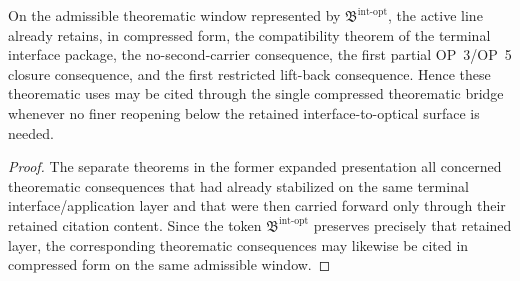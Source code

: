 \begin{theorem}
\label{thm:first-bundled-interface-compatibility-theorem}
\label{thm:first-no-second-carrier-theorem-on-the-terminal-interface}
\label{thm:first-partial-op3-op5-closure-theorem-on-the-terminal-interface}
\label{thm:first-restricted-lift-back-theorem-from-the-terminal-interface}
On the admissible theorematic window represented by $\mathfrak B^{\mathrm{int\text{-}opt}}$, the active line already retains, in compressed form, the compatibility theorem of the terminal interface package, the no-second-carrier consequence, the first partial OP~3/OP~5 closure consequence, and the first restricted lift-back consequence. Hence these theorematic uses may be cited through the single compressed theorematic bridge whenever no finer reopening below the retained interface-to-optical surface is needed.
\end{theorem}

\begin{proof}
The separate theorems in the former expanded presentation all concerned theorematic consequences that had already stabilized on the same terminal interface/application layer and that were then carried forward only through their retained citation content. Since the token $\mathfrak B^{\mathrm{int\text{-}opt}}$ preserves precisely that retained layer, the corresponding theorematic consequences may likewise be cited in compressed form on the same admissible window.
\end{proof}

